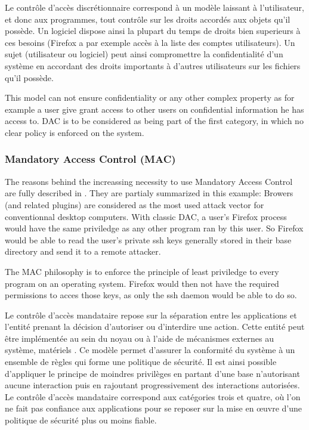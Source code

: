 \documentclass[pdftex,a4paper,titlepage,11pt]{article}
\begin{document}
Le contrôle d'accès discrétionnaire correspond à un modèle laissant à l'utilisateur, et donc aux programmes, tout contrôle sur les droits accordés aux objets qu'il possède. Un logiciel dispose ainsi la plupart du temps de droits bien superieurs à ces besoins (Firefox a par exemple accès à la liste des comptes utilisateurs). Un sujet (utilisateur ou logiciel) peut ainsi compromettre la confidentialité d'un système en accordant des droits importants à d'autres utilisateurs sur les fichiers qu'il possède.

\bigskip

This model can not ensure confidentiality or any other complex property as for example a user give grant access to other users on confidential information he has access to. DAC is to be considered as being part of the first category, in which no clear policy is enforced on the system. 


\subsubsection{Mandatory Access Control (MAC)}

The reasons behind the increassing necessity to use Mandatory Access Control are fully described in \cite{NSATIOF}. They are partialy summarized in this example: Browers (and related plugins) are considered as the most used attack vector for conventionnal desktop computers. With classic DAC, a user's Firefox process would have the same priviledge as any other program ran by this user. So Firefox would be able to read the user's private ssh keys generally stored in their base directory and send it to a remote attacker.

\bigskip

The MAC philosophy is to enforce the principle of least priviledge to every program on an operating system. Firefox would then not have the required permissions to acces those keys, as only the ssh daemon would be able to do so.


\bigskip

Le contrôle d'accès mandataire repose sur la séparation entre les applications et l'entité prenant la décision d'autoriser ou d'interdire une action. Cette entité peut être implémentée au sein du noyau ou à l'aide de mécanismes externes au système, matériels \cite{ITXT}. Ce modèle permet d'assurer la conformité du système à un ensemble de règles qui forme une politique de sécurité. Il est ainsi possible d'appliquer le principe de moindres privilèges en partant d'une base n'autorisant aucune interaction puis en rajoutant progressivement des interactions autorisées. Le contrôle d'accès mandataire correspond aux catégories trois et quatre, où l'on ne fait pas confiance aux applications pour se reposer sur la mise en \oe{}uvre d'une politique de sécurité plus ou moins fiable.
\end{document}
